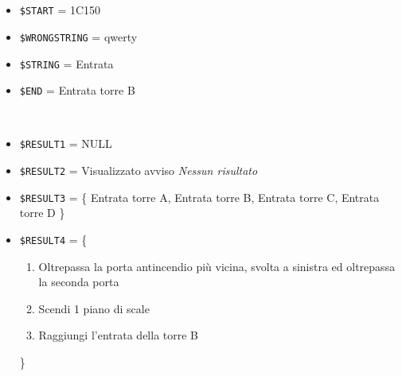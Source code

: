 \documentclass[../../SperimentazioniPratiche.tex]{subfiles}
\begin{document}
			\paragraph*{}
			\label{2Prova11A.1}
			\begin{tcolorbox}[fonttitle=\bfseries, 
								adjusted title={\Large Prova 11A.1}, 
								breakable, 
								sharp corners=south,
								colback=white, 
								colframe=white!60!black]
								
				\begin{description}[leftmargin=0.7cm,labelwidth=!]
				
					\item[Input] \ \par 
        				\begin{itemize}
        					\item \verb|$START| = 1C150
							\item \verb|$WRONGSTRING| = qwerty
							\item \verb|$STRING| = Entrata 
							\item \verb|$END| = Entrata torre B
        				\end{itemize}
        				
        			\tcbline 
        				
        			\item[Output atteso] \ \par
        				\begin{itemize}
        					\item \verb|$RESULT1| = NULL
        					\item \verb|$RESULT2| = Visualizzato avviso \textit{Nessun risultato}
        					\item \verb|$RESULT3| = \{
        						Entrata torre A, Entrata torre B, Entrata torre C, Entrata torre D
        						\}
        					\item \verb|$RESULT4| = \{
								\begin{enumerate}
        									\item Oltrepassa la porta antincendio più vicina, svolta a sinistra ed oltrepassa la seconda porta
        									\item Scendi 1 piano di scale
        									\item Raggiungi l'entrata della torre B
        								\end{enumerate}							       
        						\}
        				\end{itemize}

					\tcbline        				
        				

\end{description}
\end{tcolorbox}
\end{document}
